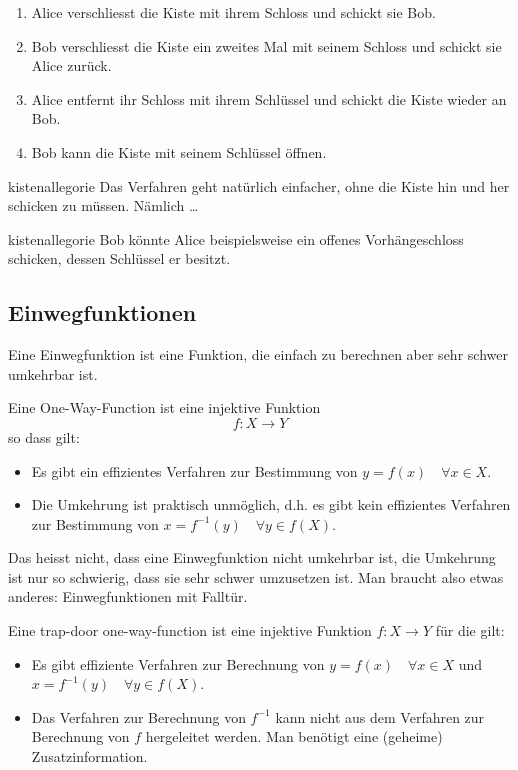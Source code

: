 \documentclass[%
<<<<<<< Updated upstream
11pt,%
twoside,%
titlepage,%
german,%
headsepline%
]{scrartcl}
\begin{document}
\begin{enumerate}
\item Alice verschliesst die Kiste mit ihrem Schloss und schickt sie Bob.
\item Bob verschliesst die Kiste ein zweites Mal mit seinem Schloss und schickt sie Alice zurück.
\item Alice entfernt ihr Schloss mit ihrem Schlüssel und schickt die Kiste wieder an Bob.
\item Bob kann die Kiste mit seinem Schlüssel öffnen.
\end{enumerate}

\begin{uebenv}{kistenallegorie}
Das Verfahren geht natürlich einfacher, ohne die Kiste hin und her schicken zu müssen. Nämlich \dots
\end{uebenv}

\begin{lsg}{kistenallegorie}
    Bob könnte Alice beispielsweise ein offenes Vorhängeschloss schicken, dessen Schlüssel er besitzt.
\end{lsg}

\subsection{Einwegfunktionen}

Eine Einwegfunktion ist eine Funktion, die einfach zu berechnen aber sehr schwer umkehrbar ist.

\begin{cdef}
Eine One-Way-Function ist eine injektive Funktion
$$f:X\to Y$$
so dass gilt:

\begin{itemize}
\item Es gibt ein effizientes Verfahren zur Bestimmung von $y=f(x)\quad\forall x\in X$.
\item Die Umkehrung ist praktisch unmöglich, d.h. es gibt kein effizientes Verfahren zur Bestimmung von $x=f^{-1}(y)\quad\forall y\in f(X)$.
\end{itemize}
\end{cdef}

\begin{bem}
Das heisst nicht, dass eine Einwegfunktion nicht umkehrbar ist, die Umkehrung ist nur so schwierig, dass sie sehr schwer umzusetzen ist. Man braucht also etwas anderes: Einwegfunktionen mit Falltür.
\end{bem}

\begin{cdef}
Eine trap-door one-way-function ist eine injektive Funktion $f:X\to Y$ für die gilt:

\begin{itemize}
\item Es gibt effiziente Verfahren zur Berechnung von $y=f(x)\quad\forall x\in X$ und $x=f^{-1}(y)\quad\forall y\in f(X)$.
\item Das Verfahren zur Berechnung von $f^{-1}$ kann nicht aus dem Verfahren zur Berechnung von $f$ hergeleitet werden. Man benötigt eine (geheime) Zusatzinformation.
\end{itemize}
\end{cdef}
\end{document}
